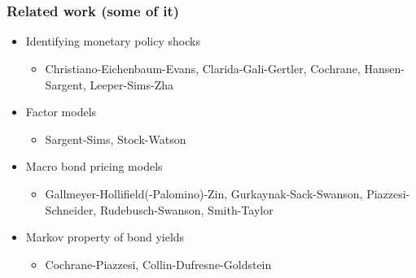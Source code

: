 \documentclass{beamer}
\begin{document}
\section{ }
\begin{frame}
\frametitle{Related work (some of it)}

\begin{itemize} \bigskipamount
\item Identifying monetary policy shocks \\
\begin{itemize}
\item Christiano-Eichenbaum-Evans,
Clarida-Gali-Gertler,
Cochrane, Hansen-Sargent,
Leeper-Sims-Zha
\end{itemize}

\item Factor models \\
\begin{itemize}
\item Sargent-Sims, Stock-Watson
\end{itemize}

\item Macro bond pricing models  \\
\begin{itemize}
\item Gallmeyer-Hollifield(-Palomino)-Zin,
Gurkaynak-Sack-Swanson,
Piazzesi-Schneider,
Rudebusch-Swanson,
Smith-Taylor
\end{itemize}

\item Markov property of bond yields   \\
\begin{itemize}
\item Cochrane-Piazzesi, Collin-Dufresne-Goldstein
\end{itemize}

\end{itemize}
\end{frame}
\end{document}
